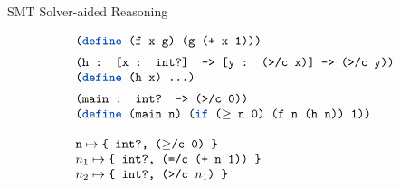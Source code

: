 \begin{frame}[t]{SMT Solver-aided Reasoning}

  \large
  \vspace{1em}
\[
\begin{array}{@{}l@{}}
  \mex{(\kw{define} (f x g) (g (+ x 1)))} \\[0.5em]
  \mex{(h : [x : int?] -> [y : (>/c x)] -> (>/c y))} \\
  \mex{(\kw{define} (h x) \ldots)} \\[0.5em]
  \mex{(main : int? -> (>/c 0))} \\
  \mex{(\kw{define} (main n) (\kw{if} ($\geq$ n 0) (f n (h n)) 1))}\\
  \\
  \mex{n} \mapsto \mex{\{ int?, ($\geq$/c 0) \}}\\
  \mex{$n_1$} \mapsto \mex{\{ int?, (=/c (+ n 1)) \}} \\
  \mex{$n_2$} \mapsto \mex{\{ int?, (>/c $n_1$) \}}
\end{array}
\]

\end{frame}

